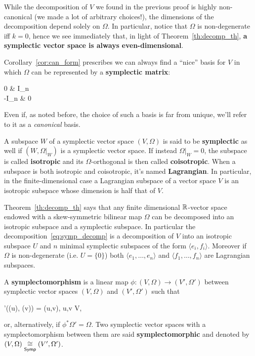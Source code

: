 \documentclass[main.tex]{subfiles}
\begin{document}
\begin{remark}
	While the decomposition of $V$ we found in the previous proof is highly non-canonical (we made a lot of arbitrary choices!), the dimensions of the decomposition depend solely on $\Omega$. In particular, notice that $\Omega$ is non-degenerate iff $k=0$, hence we see immediately that, in light of Theorem~\ref{th:decomp_th}, \textbf{a symplectic vector space is always even-dimensional}.
\end{remark}

Corollary~\ref{cor:can_form} prescribes we can always find a ``nice'' basis for $V$ in which $\Omega$ can be represented by a \textbf{symplectic matrix}:
\begin{eqalign}
	\begin{pmatrix}
		0 & I_n\\
		-I_n & 0
	\end{pmatrix}
\end{eqalign}
Even if, as noted before, the choice of such a basis is far from unique, we'll refer to it as a \emph{canonical} basis.

\begin{definition}
	A subspace $W$ of a symplectic vector space $(V, \Omega)$ is said to be \textbf{symplectic} as well if $(W, \Omega\vert_W)$ is a symplectic vector space. If instead $\Omega\vert_W = 0$, the subspace is called \textbf{isotropic} and its $\Omega$-orthogonal is then called \textbf{coisotropic}. When a subspace is both isotropic and coisotropic, it's named \textbf{Lagrangian}. In particular, in the finite-dimensional case a Lagrangian subspace of a vector space $V$ is an isotropic subspace whose dimension is half that of $V$.
\end{definition}

Theorem~\ref{th:decomp_th} says that any finite dimensional $\mathbb{R}$-vector space endowed with a skew-symmetric bilinear map $\Omega$ can be decomposed into an isotropic subspace and a symplectic subspace. In particular the decomposition~\eqref{eq:symp_decomp} is a decomposition of $V$ into an isotropic subspace $U$ and $n$ minimal symplectic subspaces of the form $\langle e_i, f_i \rangle$. Moreover if $\Omega$ is non-degenerate (i.e. $U=\{ 0 \}$) both $\langle e_1, \ldots, e_n\rangle$ and $\langle f_1, \ldots, f_n\rangle$ are Lagrangian subspaces.

\begin{definition}
	A \textbf{symplectomorphism} is a linear map $\phi : (V, \Omega) \to (V', \Omega')$ between symplectic vector spaces $(V, \Omega)$ and $(V', \Omega')$ such that
	\begin{eqalign}
		\Omega'(\phi(u), \phi(v)) = \Omega(u,v), \quad \forall u,v \in V,
	\end{eqalign}
	or, alternatively, if $\phi^* \Omega' = \Omega$. Two symplectic vector spaces with a symplectomorphism between them are said \textbf{symplectomorphic} and denoted by $(V, \Omega) \underset{\cat{Symp}}\iso (V', \Omega')$.
\end{definition}
\end{document}
